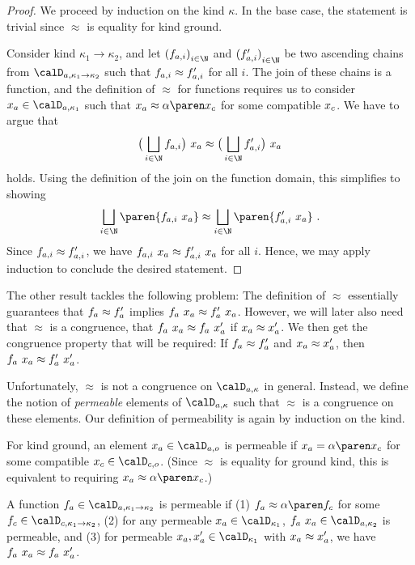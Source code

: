 \documentclass[../../diss.tex]{subfiles}
\begin{document}
\begin{proof}
    We proceed by induction on the kind $\kappa$.
    In the base case, the statement is trivial since $\approx$ is equality for kind ground.

    Consider kind $\kappa_1 \to \kappa_2$, and let ${(\fai)}_{i \in \N}$ and ${(\fai')}_{i \in \N}$ be two ascending chains from $\domaina{\kappa_1 \to \kappa_2}$ such that $f_{a,i} \approx f_{a,i}'$ for all $i$.
    The join of these chains is a function, and the definition of $\approx$ for functions requires us to consider $\xa \in \domaina{\kappa_1}$ such that $\xa \approx \abs{\xc}$ for some compatible $x_c$.
    We have to argue that
    \[
        \big(\bigsqcup_{i \in \N } \fai\big) \appl \xa
        \approx
        \big(\bigsqcup_{i \in \N} \fai'\big) \appl \xa
    \]
    holds.
    Using the definition of the join on the function domain, this simplifies to showing
    \[
        \bigsqcup_{i \in \N } \paren{\fai \appl \xa}
        \approx
        \bigsqcup_{i \in \N} \paren{\fai' \appl \xa}
        \ .
    \]
    Since $f_{a,i} \approx f_{a,i}'$, we have $f_{a,i} \  x_a \approx f_{a,i}' \  x_a$ for all $i$.
    Hence, we may apply induction to conclude the desired statement.
\end{proof}

The other result tackles the following problem:
The definition of $\approx$ essentially guarantees that $f_a \approx f_a'$ implies $f_a \  x_a \approx f_a' \  x_a$.
However, we will later also need that $\approx$ is a congruence, \ie that $f_a \  x_a \approx f_a \  x_a'$ if $x_a \approx x_a'$.
We then get the congruence property that will be required: If $f_a \approx f_a'$ and $x_a \approx x_a'$, then $f_a \  x_a \approx f_a' \  x_a'$.

Unfortunately, $\approx$ is not a congruence on $\domaina{\kappa}$ in general.
Instead, we define the notion of \emph{permeable} elements of $\domaina{\kappa}$ such that $\approx$ is a congruence on these elements.
Our definition of permeability is again by induction on the kind.

For kind ground, an element $\xa \in \domaina{\ground}$ is permeable if $\xa = \abs{\xc}$ for some compatible $\xc \in \domainc{\ground}$.
(Since $\approx$ is equality for ground kind, this is equivalent to requiring $\xa \approx \abs{\xc}$.)

A function $\fa \in \domaina{\kappa_1 \to \kappa_2}$ is permeable if
(1) $\fa \approx \abs{\fc}$ for some $\fc \in \domainc{\kappa_1 \to \kappa_2}$,
(2) for any permeable $\xa \in \domain{\kappa_1}$, $\fa \appl \xa \in \domaina{\kappa_2}$ is permeable,
and
(3) for permeable $\xa, \xa' \in \domain{\kappa_1}$ with $x_a \approx x_a'$, we have $f_a \  x_a \approx f_a \  x_a'$.
\end{document}
